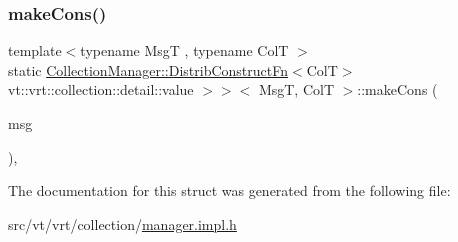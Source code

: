\subsubsection{\texorpdfstring{make\+Cons()}{makeCons()}}
{\footnotesize\ttfamily template$<$typename MsgT , typename ColT $>$ \\
static \hyperlink{structvt_1_1vrt_1_1collection_1_1_collection_manager_a7503830bc133013d542856fa39834dcc}{Collection\+Manager\+::\+Distrib\+Construct\+Fn}$<$ColT$>$ vt\+::vrt\+::collection\+::detail\+::value $>$$>$$<$ MsgT, ColT $>$\+::make\+Cons (\begin{DoxyParamCaption}\item[{\hyperlink{namespacevt_ab2b3d506ec8e8d1540aede826d84a239}{Msg\+Shared\+Ptr}$<$ MsgT $>$}]{msg }\end{DoxyParamCaption})\hspace{0.3cm}{\ttfamily [inline]}, {\ttfamily [static]}}



The documentation for this struct was generated from the following file\+:\begin{DoxyCompactItemize}
\item 
src/vt/vrt/collection/\hyperlink{vrt_2collection_2manager_8impl_8h}{manager.\+impl.\+h}\end{DoxyCompactItemize}
